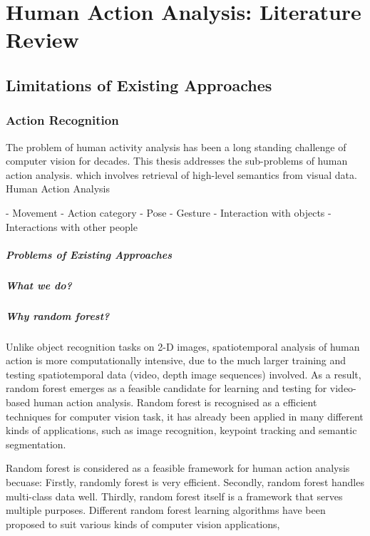 \chapter{Human Action Analysis: Literature Review}
\label{chap/lithuman}

\section{Limitations of Existing Approaches} 

\subsection{Action Recognition}



The problem of human activity analysis has been a long standing challenge of computer vision for decades. 
This thesis addresses the sub-problems of human action analysis.  
which involves retrieval of high-level semantics from visual data. 
Human Action Analysis

- Movement
- Action category   
- Pose
- Gesture
- Interaction with objects
- Interactions with other people

\paragraph{Problems of Existing Approaches}

\paragraph{What we do?} 

\paragraph{Why random forest?} 

Unlike object recognition tasks on 2-D images, spatiotemporal analysis of human action is more computationally intensive, due to the much larger training and testing spatiotemporal data (video, depth image sequences) involved. 
As a result, random forest emerges as a feasible candidate for learning and testing for video-based human action analysis.
Random forest is recognised as a efficient techniques for computer vision task, it has already been applied in many different kinds of applications, such as image recognition, keypoint tracking and semantic segmentation. 

Random forest is considered as a feasible framework for human action analysis becuase:
Firstly, randomly forest is very efficient. 
Secondly, random forest handles multi-class data well. 
Thirdly, random forest itself is a framework that serves multiple purposes. Different random forest learning algorithms have been proposed to suit various kinds of computer vision applications, \eg  


